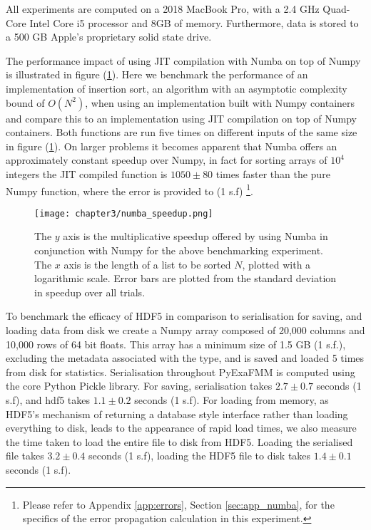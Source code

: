 All experiments are computed on a 2018 MacBook Pro, with a 2.4 GHz Quad-Core
Intel Core i5 processor and 8GB of memory. Furthermore, data is stored to a
500 GB Apple's proprietary solid state drive.

The performance impact of using \gls{JIT} compilation with Numba on top of Numpy
is illustrated in figure (\ref{fig:3_1_numba}). Here we benchmark the performance
of an implementation of insertion sort, an algorithm with an asymptotic complexity
bound of $O(N^2)$, when using an implementation built with Numpy containers and
compare this to an implementation using JIT compilation on top of Numpy containers.
Both functions are run five times on different inputs of the same size
in figure (\ref{fig:3_1_numba}). On larger problems it becomes apparent
that Numba offers an approximately constant speedup over Numpy, in fact for
sorting arrays of $10^4$ integers the JIT compiled function is $1050 \pm 80$
times faster than the pure Numpy function, where the error is provided to (1 s.f)
\footnote{Please refer to Appendix \ref{app:errors}, Section \ref{sec:app_numba},
for the specifics of the error propagation calculation in this experiment.}.

\begin{figure}[ht]
    \centering

  {\texttt{[image: chapter3/numba\_speedup.png]}}
  \vspace{0pt}
    \caption{The $y$ axis is the multiplicative speedup offered by using Numba in
    conjunction with Numpy for the above benchmarking experiment. The $x$ axis is
    the length of a list to be sorted $N$, plotted with a logarithmic scale. Error
    bars are plotted from the standard deviation in speedup over all trials.}
    \label{fig:3_1_numba}
\end{figure}

To benchmark the efficacy of HDF5 in comparison to serialisation for saving,
and loading data from disk we create a Numpy array composed of
20,000 columns and 10,000 rows of 64 bit floats. This array has a minimum size
of 1.5 GB (1 s.f.), excluding the metadata associated with the type, and is
saved and loaded 5 times from disk for statistics. Serialisation throughout
\gls{PyExaFMM} is computed using the core Python Pickle library. For saving,
serialisation takes $2.7 \pm 0.7$ seconds (1 s.f), and hdf5 takes $1.1 ± 0.2$ seconds (1 s.f).
For loading from memory, as HDF5's mechanism of returning a database style interface
rather than loading everything to disk, leads to the appearance of rapid
load times, we also measure the time taken to load the entire file to disk from
HDF5. Loading the serialised file takes $3.2 \pm 0.4$ seconds (1 s.f), loading
the HDF5 file to disk takes $1.4 \pm 0.1$ seconds (1 s.f).


